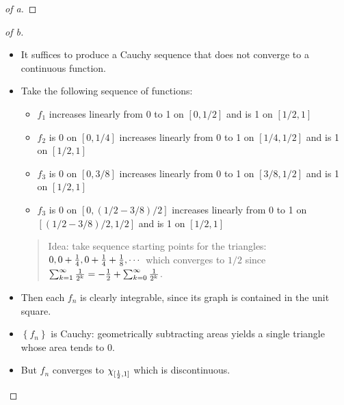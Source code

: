 \begin{solution}
\begin{proof}[of a]
\end{proof}

\begin{proof}[of b]

\envlist

\begin{itemize}
\item
  It suffices to produce a Cauchy sequence that does not converge to a
  continuous function.
\item
  Take the following sequence of functions:

  \begin{itemize}
  \tightlist
  \item
    \(f_1\) increases linearly from 0 to 1 on \([0, 1/2]\) and is 1 on
    \([1/2, 1]\)
  \item
    \(f_2\) is 0 on \([0, 1/4]\) increases linearly from 0 to 1 on
    \([1/4, 1/2]\) and is 1 on \([1/2, 1]\)
  \item
    \(f_3\) is 0 on \([0, 3/8]\) increases linearly from 0 to 1 on
    \([3/8, 1/2]\) and is 1 on \([1/2, 1]\)
  \item
    \(f_3\) is 0 on \([0, (1/2 - 3/8)/2]\) increases linearly from 0 to
    1 on \([(1/2 - 3/8)/2, 1/2]\) and is 1 on \([1/2, 1]\)
  \end{itemize}

  \begin{quote}
  Idea: take sequence starting points for the triangles:
  \(0, 0 + {1\over 4}, 0 + {1 \over 4} + {1\over 8}, \cdots\) which
  converges to \(1/2\) since
  \(\sum_{k=1}^\infty{1\over 2^k} = -{1\over 2} + \sum_{k=0}^\infty {1\over 2^k}\).
  \end{quote}
\item
  Then each \(f_n\) is clearly integrable, since its graph is contained
  in the unit square.
\item
  \(\left\{{f_n}\right\}\) is Cauchy: geometrically subtracting areas
  yields a single triangle whose area tends to 0.
\item
  But \(f_n\) converges to \(\chi_{[{1\over 2}, 1]}\) which is
  discontinuous.
\end{itemize}


\end{proof}

\end{solution}

